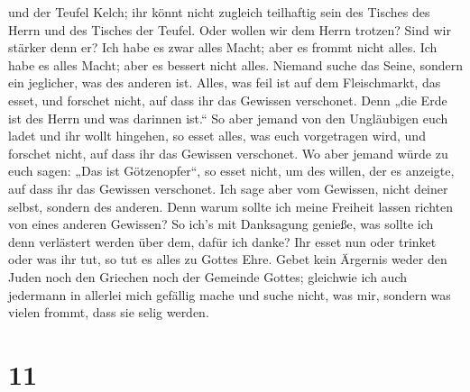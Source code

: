 und der Teufel Kelch; ihr könnt nicht zugleich teilhaftig sein des
Tisches des Herrn und des Tisches der Teufel.  Oder
wollen wir dem Herrn trotzen? Sind wir stärker denn er? 
Ich habe es zwar alles Macht; aber es frommt nicht alles. Ich habe es
alles Macht; aber es bessert nicht alles.  Niemand suche
das Seine, sondern ein jeglicher, was des anderen ist. 
Alles, was feil ist auf dem Fleischmarkt, das esset, und forschet nicht,
auf dass ihr das Gewissen verschonet.  Denn „die Erde ist
des Herrn und was darinnen ist.``  So aber jemand von den
Ungläubigen euch ladet und ihr wollt hingehen, so esset alles, was euch
vorgetragen wird, und forschet nicht, auf dass ihr das Gewissen
verschonet.  Wo aber jemand würde zu euch sagen: „Das ist
Götzenopfer``, so esset nicht, um des willen, der es anzeigte, auf dass
ihr das Gewissen verschonet.  Ich sage aber vom Gewissen,
nicht deiner selbst, sondern des anderen. Denn warum sollte ich meine
Freiheit lassen richten von eines anderen Gewissen?  So
ich's mit Danksagung genieße, was sollte ich denn verlästert werden über
dem, dafür ich danke?  Ihr esset nun oder trinket oder
was ihr tut, so tut es alles zu Gottes Ehre.  Gebet kein
Ärgernis weder den Juden noch den Griechen noch der Gemeinde Gottes;
 gleichwie ich auch jedermann in allerlei mich gefällig
mache und suche nicht, was mir, sondern was vielen frommt, dass sie
selig werden.

\hypertarget{section-10}{%
\section{11}\label{section-10}}

